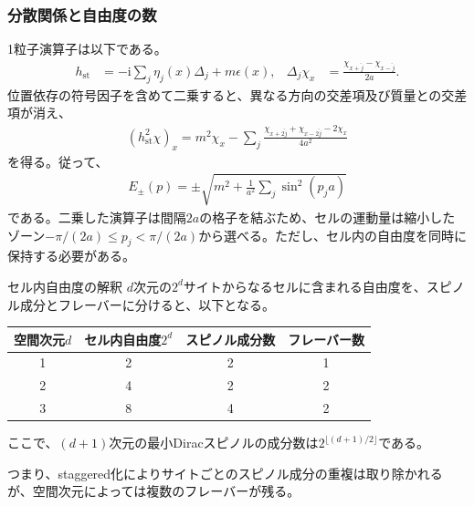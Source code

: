 \documentclass[a4paper,10.5pt]{article}
\numberwithin{equation}{section}
\providecommand{\ii}{\mathrm{i}}
\providecommand{\st}{\mathrm{st}}
\begin{document}
\subsubsection{分散関係と自由度の数}
1粒子演算子は以下である。
\begin{align}
h_{\st}&=-\ii\sum_j\eta_j(x)\Delta_j+m\epsilon(x),&
\Delta_j\chi_x&=\frac{\chi_{x+\hat j}-\chi_{x-\hat j}}{2a}.
\end{align}
位置依存の符号因子を含めて二乗すると、異なる方向の交差項及び質量との交差項が消え、
\begin{align}
(h_{\st}^2\chi)_x
=m^2\chi_x-\sum_j
\frac{\chi_{x+2\hat j}+\chi_{x-2\hat j}-2\chi_x}{4a^2}
\end{align}
を得る。従って、
\begin{align}
E_\pm(p)=\pm\sqrt{m^2+\frac1{a^2}\sum_j\sin^2(p_ja)}
\end{align}
である。二乗した演算子は間隔$2a$の格子を結ぶため、セルの運動量は縮小したゾーン$-\pi/(2a)\leq p_j<\pi/(2a)$から選べる。ただし、セル内の自由度を同時に保持する必要がある。

\begin{resultbox}{セル内自由度の解釈}
$d$次元の$2^d$サイトからなるセルに含まれる自由度を、スピノル成分とフレーバーに分けると、以下となる。
\begin{center}
\begin{tabular}{c|c|c|c}
空間次元$d$ & セル内自由度$2^d$ & スピノル成分数 & フレーバー数\\ \hline
1 & 2 & 2 & 1\\
2 & 4 & 2 & 2\\
3 & 8 & 4 & 2
\end{tabular}
\end{center}
ここで、$(d+1)$次元の最小Diracスピノルの成分数は$2^{\lfloor(d+1)/2\rfloor}$である。
\end{resultbox}
つまり、staggered化によりサイトごとのスピノル成分の重複は取り除かれるが、空間次元によっては複数のフレーバーが残る。
\end{document}
